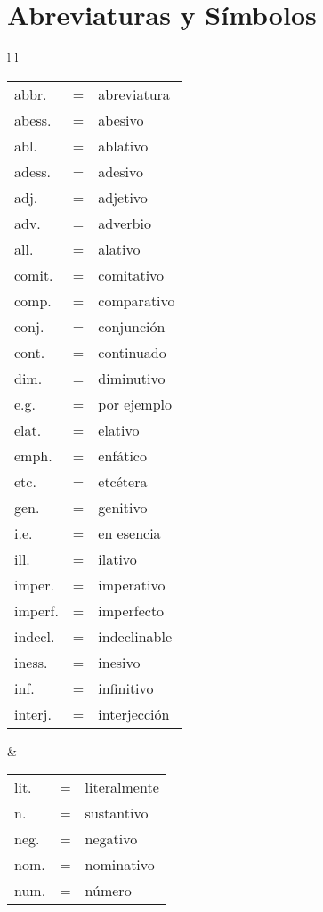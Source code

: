 

\chapter*{Abreviaturas y Símbolos} %

\begin{tabular}{ l l }
	\begin{tabular}{ l c l }
	abbr.	& = & abreviatura \\
	abess.	& = & abesivo \\
	abl.	& = & ablativo \\
	adess.	& = & adesivo \\
	adj.	& = & adjetivo \\
	adv.	& = & adverbio \\
	all.	& = & alativo \\
	comit.	& = & comitativo \\
	comp.	& = & comparativo \\
	conj.	& = & conjunción \\
	cont.	& = & continuado \\
	dim.	& = & diminutivo \\
	e.g.	& = & por ejemplo \\
	elat.	& = & elativo \\
	emph.	& = & enfático \\
	etc.	& = & etcétera \\
	gen.	& = & genitivo \\
	i.e.	& = & en esencia \\
	ill.	& = & ilativo \\
	imper.	& = & imperativo \\
	imperf.	& = & imperfecto \\
	indecl.	& = & indeclinable \\
	iness.	& = & inesivo \\
	inf.	& = & infinitivo \\
	interj.	& = & interjección
	\end{tabular}
&
	\begin{tabular}{ l c l }
	lit.	& = & literalmente \\
	n.		& = & sustantivo \\
	neg.	& = & negativo \\
	nom.	& = & nominativo \\
	num.	& = & número \\

\end{tabular}
\end{tabular}
